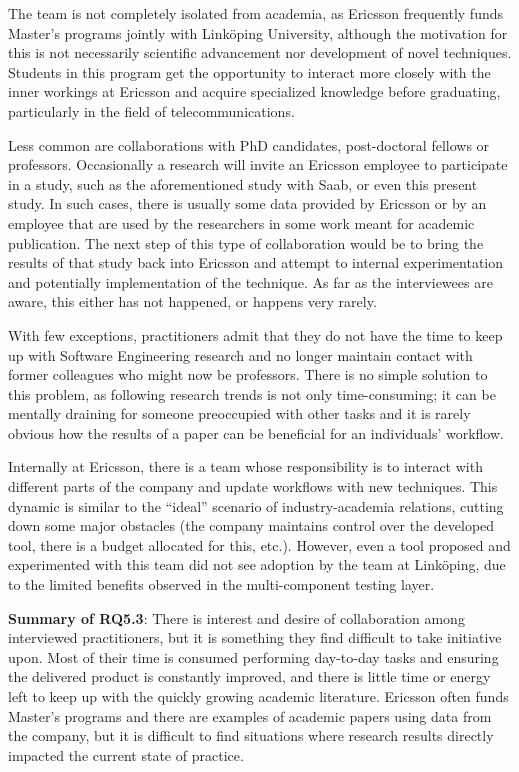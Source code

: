 The team is not completely isolated from academia, as Ericsson frequently funds Master's programs jointly with Link\"oping University, although the motivation for this is not necessarily scientific advancement nor development of novel techniques.
Students in this program get the opportunity to interact more closely with the inner workings at Ericsson and acquire specialized knowledge before graduating, particularly in the field of telecommunications.

Less common are collaborations with PhD candidates, post-doctoral fellows or professors.
Occasionally a research will invite an Ericsson employee to participate in a study, such as the aforementioned study with Saab, or even this present study.
In such cases, there is usually some data provided by Ericsson or by an employee that are used by the researchers in some work meant for academic publication.
The next step of this type of collaboration would be to bring the results of that study back into Ericsson and attempt to internal experimentation and potentially implementation of the technique.
As far as the interviewees are aware, this either has not happened, or happens very rarely.

With few exceptions, practitioners admit that they do not have the time to keep up with Software Engineering research and no longer maintain contact with former colleagues who might now be professors.
There is no simple solution to this problem, as following research trends is not only time-consuming; it can be mentally draining for someone preoccupied with other tasks and it is rarely obvious how the results of a paper can be beneficial for an individuals' workflow.

Internally at Ericsson, there is a team whose responsibility is to interact with different parts of the company and update workflows with new techniques.
This dynamic is similar to the ``ideal'' scenario of industry-academia relations, cutting down some major obstacles (the company maintains control over the developed tool, there is a budget allocated for this, etc.).
However, even a tool proposed and experimented with this team did not see adoption by the team at Linköping, due to the limited benefits observed in the multi-component testing layer.

\begin{tcolorbox}%
\textbf{Summary of RQ5.3}: 
There is interest and desire of collaboration among interviewed practitioners, but it is something they find difficult to take initiative upon.
Most of their time is consumed performing day-to-day tasks and ensuring the delivered product is constantly improved, and there is little time or energy left to keep up with the quickly growing academic literature.
Ericsson often funds Master's programs and there are examples of academic papers using data from the company, but it is difficult to find situations where research results directly impacted the current state of practice.
\end{tcolorbox}
